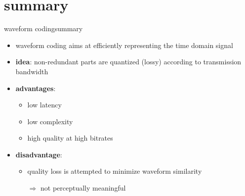 \section{summary}
		\begin{frame}{waveform coding}{summary}
            \begin{itemize}
                \item   waveform coding aims at efficiently representing the time domain signal
                \item   \textbf{idea}: non-redundant parts are quantized (lossy) according to transmission bandwidth
                \bigskip
                \item<2->   \textbf{advantages}: 
                    \begin{itemize}
                        \item   low latency
                        \item   low complexity
                        \item   high quality at high bitrates
                    \end{itemize}
               \bigskip
                \item<3->    \textbf{disadvantage}:
                    \begin{itemize}
                        \item   quality loss is attempted to minimize waveform similarity
                        \item[$\Rightarrow$] not perceptually meaningful
                    \end{itemize}
            \end{itemize}
 		\end{frame}



